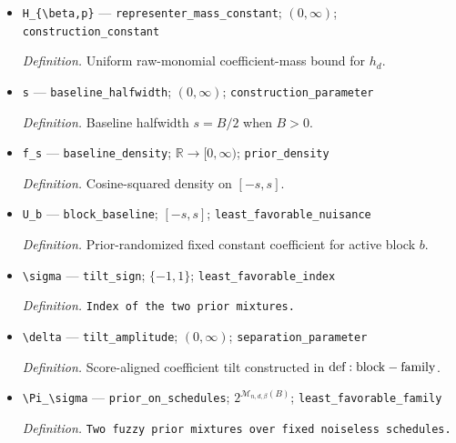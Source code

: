 \documentclass{article}
\begin{document}
\begin{itemize}
  \par\smallskip\noindent\emph{Definition.} Raw-monomial coefficient in \(h_d(z)=\sum_T h_{d,T}\prod_{j\in T}z_j\).
  \item \texttt{H\_\allowbreak{}\{\textbackslash{}\allowbreak{}beta,\allowbreak{}p\}\allowbreak{}} --- \texttt{representer\_\allowbreak{}mass\_\allowbreak{}constant}; \((0,\infty)\); \texttt{construction\_\allowbreak{}constant}
  \par\smallskip\noindent\emph{Definition.} Uniform raw-monomial coefficient-mass bound for \(h_d\).
  \item \texttt{s} --- \texttt{baseline\_\allowbreak{}halfwidth}; \((0,\infty)\); \texttt{construction\_\allowbreak{}parameter}
  \par\smallskip\noindent\emph{Definition.} Baseline halfwidth \(s=B/2\) when \(B>0\).
  \item \texttt{f\_\allowbreak{}s} --- \texttt{baseline\_\allowbreak{}density}; \(\mathbb R\to[0,\infty)\); \texttt{prior\_\allowbreak{}density}
  \par\smallskip\noindent\emph{Definition.} Cosine-squared density on \([-s,s]\).
  \item \texttt{U\_\allowbreak{}b} --- \texttt{block\_\allowbreak{}baseline}; \([-s,s]\); \texttt{least\_\allowbreak{}favorable\_\allowbreak{}nuisance}
  \par\smallskip\noindent\emph{Definition.} Prior-randomized fixed constant coefficient for active block \(b\).
  \item \texttt{\textbackslash{}\allowbreak{}sigma} --- \texttt{tilt\_\allowbreak{}sign}; \(\{-1,1\}\); \texttt{least\_\allowbreak{}favorable\_\allowbreak{}index}
  \par\smallskip\noindent\emph{Definition.} \texttt{Index of the two prior mixtures.}
  \item \texttt{\textbackslash{}\allowbreak{}delta} --- \texttt{tilt\_\allowbreak{}amplitude}; \((0,\infty)\); \texttt{separation\_\allowbreak{}parameter}
  \par\smallskip\noindent\emph{Definition.} Score-aligned coefficient tilt constructed in \({\rm def:block-family}\).
  \item \texttt{\textbackslash{}\allowbreak{}Pi\_\allowbreak{}\textbackslash{}\allowbreak{}sigma} --- \texttt{prior\_\allowbreak{}on\_\allowbreak{}schedules}; \(2^{\mathcal M_{n,d,\beta}(B)}\); \texttt{least\_\allowbreak{}favorable\_\allowbreak{}family}
  \par\smallskip\noindent\emph{Definition.} \texttt{Two fuzzy prior mixtures over fixed noiseless schedules.}

\end{itemize}
\end{document}
